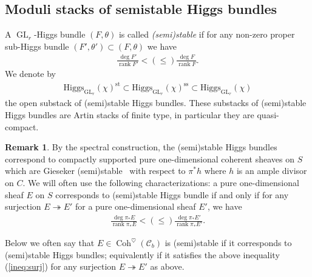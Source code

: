 \documentclass[11pt,oneside,a4paper,mathscr]{amsart}
\theoremstyle{definition}
\newtheorem{remark}[thm]{Remark}
\renewcommand{\leq}{\leqslant}
\newcommand{\cC}{\mathcal{C}}
\newcommand{\rank}{\operatorname{rank}}
\newcommand{\Coh}{\operatorname{Coh}}
\newcommand{\GL}{\operatorname{GL}}
\newcommand{\Hig}{\mathrm{Higgs}}
\begin{document}
\subsection{Moduli stacks of semistable Higgs bundles}
A $\GL_r$-Higgs bundle $(F, \theta)$ is called \textit{(semi)stable} if 
for any non-zero proper sub-Higgs bundle $(F', \theta') \subset (F, \theta)$ 
we have 
\begin{align}\label{ineq:deg}
    \frac{\deg F'}{\rank F'} <(\leq) \frac{\deg F}{\rank F}. 
\end{align}
We denote by 
\begin{align*}
\Hig_{\GL_r}(\chi)^{\mathrm{st}} \subset 
    \Hig_{\GL_r}(\chi)^{\mathrm{ss}} \subset \Hig_{\GL_r}(\chi)
\end{align*}
the open substack of (semi)stable Higgs bundles. These substacks of (semi)stable Higgs bundles are 
Artin stacks of finite type, in particular they are 
quasi-compact. 

\begin{remark}\label{rmk:ss:spec}
By the spectral construction, 
the (semi)stable Higgs bundles correspond to compactly supported 
pure one-dimensional coherent sheaves on $S$
which are Gieseker (semi)stable~\cite{Hu} 
with respect 
to $\pi^* h$ where $h$ is an ample divisor on $C$. 
We will often use the following characterizations: 
a pure one-dimensional sheaf $E$ on $S$ corresponds to (semi)stable 
Higgs bundle if and only if for any surjection $E\twoheadrightarrow E'$
for a pure one-dimensional sheaf $E'$, we have
\begin{align}\label{ineq:surj}
    \frac{\deg \pi_{*}E}{\operatorname{rank}\pi_{*}E}<(\leq) 
     \frac{\deg \pi_{*}E'}{\operatorname{rank}\pi_{*}E'}. 
\end{align}

Below we often say that $E\in \Coh^{\heartsuit}(\cC_b)$ is (semi)stable if it corresponds to (semi)stable Higgs bundles; equivalently if it satisfies the above inequality (\ref{ineq:surj}) for any surjection $E\twoheadrightarrow E'$ as above. 
\end{remark}
\end{document}
